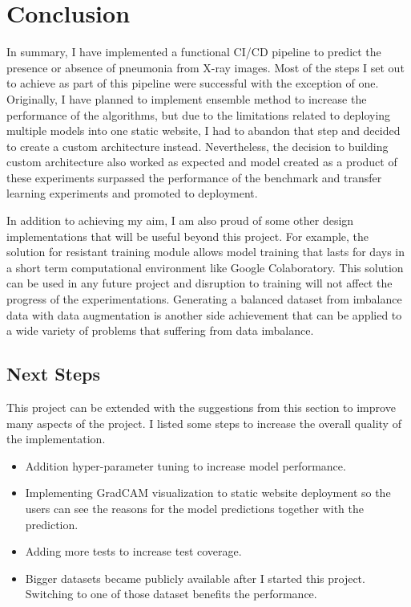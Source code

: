 \chapter{Conclusion}
In summary, I have implemented a functional CI/CD pipeline to predict the presence or absence of pneumonia from X-ray images.
Most of the steps I set out to achieve as part of this pipeline were successful with the exception of one. 
Originally, I have planned to implement ensemble method to increase the performance of the algorithms, but due to the limitations related to deploying multiple models into one static website, I had to abandon that step and decided to create a custom architecture instead.
Nevertheless, the decision to building custom architecture also worked as expected and model created as a product of these experiments surpassed the performance of the benchmark and transfer learning experiments and promoted to deployment.

In addition to achieving my aim, I am also proud of some other design implementations that will be useful beyond this project.
For example, the solution for resistant training module allows model training that lasts for days in a short term computational environment like Google Colaboratory.
This solution can be used in any future project and disruption to training will not affect the progress of the experimentations.
Generating a balanced dataset from imbalance data with data augmentation is another side achievement that can be applied to a wide variety of problems that suffering from data imbalance.

\section{Next Steps}
This project can be extended with the suggestions from this section to improve many aspects of the project.
I listed some steps to increase the overall quality of the implementation.

\begin{itemize}
    \item Addition hyper-parameter tuning to increase model performance.
    \item Implementing GradCAM visualization to static website deployment so the users can see the reasons for the model predictions together with the prediction.
    \item Adding more tests to increase test coverage.
    \item Bigger datasets became publicly available after I started this project. Switching to one of those dataset benefits the performance.
\end{itemize}


